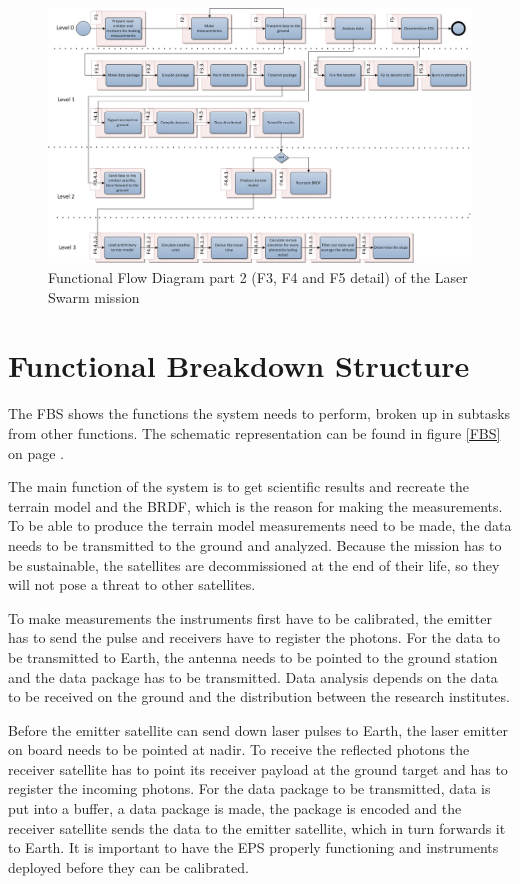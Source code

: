 \begin{landscape}
\begin{figure}[ht!]
\centering
\includegraphics[width=1.3\textheight]{chapters/img/FFD2.jpg}
\caption{Functional Flow Diagram part 2 (F3, F4 and F5 detail) of the Laser Swarm mission}
\label{FFD2}
\end{figure}
\end{landscape}

\section{Functional Breakdown Structure}
\label{section_FBS}
The \ac{FBS} shows the functions the system needs to perform, broken up in subtasks from other functions. The schematic representation can be found in figure \ref{FBS} on page \pageref{FBS}.

The main function of the system is to get scientific results and recreate the terrain model and the \acs{BRDF}, which is the reason for making the measurements. To be able to produce the terrain model measurements need to be made, the data needs to be transmitted to the ground and analyzed. Because the mission has to be sustainable, the satellites are decommissioned at the end of their life, so they will not pose a threat to other satellites.

To make measurements the instruments first have to be calibrated, the emitter has to send the pulse and receivers have to register the photons. For the data to be transmitted to Earth, the antenna needs to be pointed to the ground station and the data package has to be transmitted. Data analysis depends on the data to be received on the ground and the distribution between the research institutes.

Before the emitter satellite can send down laser pulses to Earth, the laser emitter on board needs to be pointed at nadir. To receive the reflected photons the receiver satellite has to point its receiver payload at the ground target and has to register the incoming photons. For the data package to be transmitted, data is put into a buffer, a data package is made, the package is encoded and the receiver satellite sends the data to the emitter satellite, which in turn forwards it to Earth. It is important to have the \ac{EPS} properly functioning and instruments deployed before they can be calibrated.

